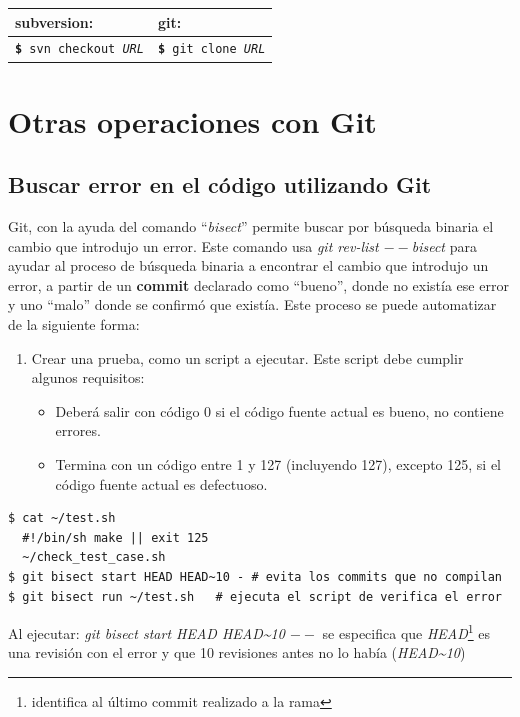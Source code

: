 \documentclass[12pt, spanish, oneside, onecolumn, a4paper]{report}
\newcommand{\svngit}[2]{%

  \begin{tabular}{| l | l |} 
    \hline subversion: & git: \\
    \hline 
    \colorbox{mygray}{\texttt{\textbf{\footnotesize\$} #1}} & \colorbox{mygray}{ \texttt{\textbf{\footnotesize\$} #2}} 
  \end{tabular}

}
\begin{document}
% 
\svngit{svn checkout \emph{URL}}{git clone \emph{URL}} 
\chapter{Otras operaciones con Git} 
\label{chap:othergit} 
\section{Buscar error en el código utilizando Git} 
\label{sec:testingwithgit} Git, con la ayuda del comando ``\emph{bisect}'' permite buscar por búsqueda binaria el cambio que introdujo un error. Este comando usa 
\emph{git rev-list $--$bisect} para ayudar al proceso de búsqueda binaria a encontrar el cambio que introdujo un error, a partir de un 
\textbf{commit} declarado como ``bueno'', donde no existía ese error y uno ``malo'' donde se confirmó que existía. Este proceso se puede automatizar de la siguiente forma: 
\begin{enumerate} 
\item Crear una prueba, como un script a ejecutar. Este script debe cumplir algunos requisitos: 
  \begin{itemize} 
  \item Deberá salir con código 0 si el código fuente actual es bueno, no contiene errores.
  \item Termina con un código entre 1 y 127 (incluyendo 127), excepto 125, si el código fuente actual es defectuoso. 
  \end{itemize} 
\end{enumerate} 
\begin{verbatim}
$ cat ~/test.sh 
  #!/bin/sh make || exit 125
  ~/check_test_case.sh
$ git bisect start HEAD HEAD~10 - # evita los commits que no compilan
$ git bisect run ~/test.sh   # ejecuta el script de verifica el error
\end{verbatim}


Al ejecutar: \emph{git bisect start HEAD HEAD\~{}10 $--$} se especifica que \emph {HEAD}\footnote{identifica al último commit realizado a la rama} es una revisión con el error y que 10 revisiones antes no lo había (\emph{HEAD\~{}10})

\glsaddall 
\printglossaries 
\end{document}
